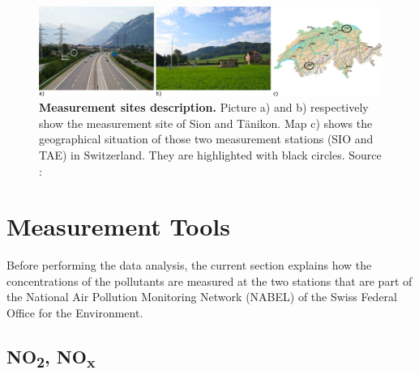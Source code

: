 \documentclass[a4paper, 12pt]{article}
\begin{document}
    \begin{figure}[h]
        \centering
        \includegraphics[width = 1 \textwidth]{Figures/Locations.png}
        \caption{\textbf{Measurement sites description.} Picture a) and b) respectively show the measurement site of Sion and Tänikon. Map c) shows the geographical situation of those two measurement stations (SIO and TAE) in Switzerland. They are highlighted with black circles. Source : \cite{NABEL}}
        \label{location_fig}
    \end{figure}

\section{Measurement Tools}
    
    Before performing the data analysis, the current section explains how the concentrations of the pollutants are measured at the two stations that are part of the National Air Pollution Monitoring Network (NABEL) of the Swiss Federal Office for the Environment. \cite{NABEL}
    
    \subsection{NO\textsubscript{2}, NO\textsubscript{x}}
    
\end{document}
